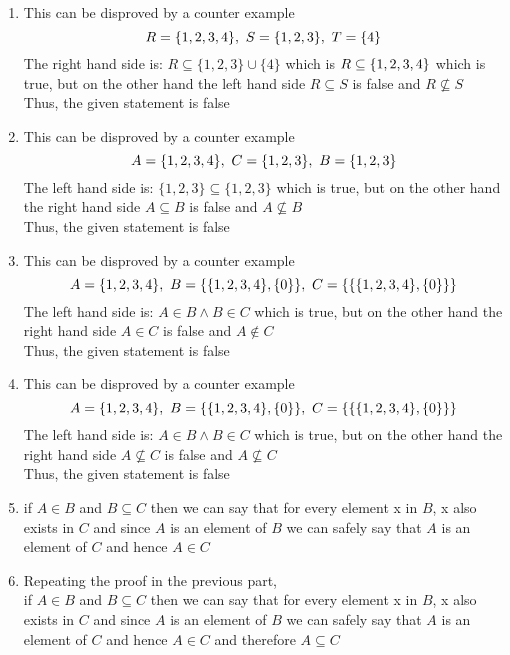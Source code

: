 \documentclass[12pt]{article}
\newenvironment{solution}[2][Solution]{ \begin{trivlist}
\item[\hskip \labelsep {\bfseries #1}]}{\end{trivlist}}
\begin{document}
\begin{solution}{1}
\item[] 
\begin{enumerate}[label=\alph*)]
\item This can be disproved by a counter example $$R = \{1,2,3,4\},\ S = \{1,2,3\},\ T = \{4\} \\$$
The right hand side is:
$R \subseteq \{1,2,3\} \cup \{4\}$ which is $R \subseteq \{1,2,3,4\} \\$ which is true, but on the other hand the left hand side $R \subseteq S$ is false and $R \nsubseteq S$ \\
Thus, the given statement is false

\item This can be disproved by a counter example $$A = \{1,2,3,4\},\ C = \{1,2,3\},\ B = \{1,2,3\} \\$$
The left hand side is:
$\{1,2,3\} \subseteq \{1,2,3\}$ which is true, but on the other hand the right hand side $A \subseteq B$ is false and $A \nsubseteq B$ \\
Thus, the given statement is false

\item This can be disproved by a counter example $$A = \{1,2,3,4\},\ B = \{\{1,2,3,4\},\{0\}\},\ C = \{\{\{1,2,3,4\},\{0\}\}\} \\$$
The left hand side is:
$A \in B \wedge B \in C$ which is true, but on the other hand the right hand side $A \in C$ is false and $A \notin C$ \\
Thus, the given statement is false

\item This can be disproved by a counter example $$A = \{1,2,3,4\},\ B = \{\{1,2,3,4\},\{0\}\},\ C = \{\{\{1,2,3,4\},\{0\}\}\} \\$$
The left hand side is:
$A \in B \wedge B \in C$ which is true, but on the other hand the right hand side $A \nsubseteq C$ is false and $A \nsubseteq C$ \\
Thus, the given statement is false

\item if $A \in B$ and $B \subseteq C$ then we can say that for every element x in $B$, x also exists in $C$ and since $A$ is an element of $B$ we can safely say that $A$ is an element of $C$ and hence $A \in C$

\item Repeating the proof in the previous part,\\ if $A \in B$ and $B \subseteq C$ then we can say that for every element x in $B$, x also exists in $C$ and since $A$ is an element of $B$ we can safely say that $A$ is an element of $C$ and hence $A \in C$ and therefore $A \subseteq C$
\end{enumerate}
\end{solution}
\end{document}

